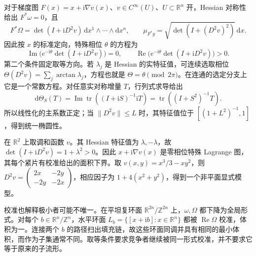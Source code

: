 对于梯度图 \(F(x)=x+\mathrm i\nabla v(x)\)、\(v\in C^\infty(U)\)、\(U\subset\mathbb R^n\) 开，Hessian 对称性给出 \(F^*\omega=0\)，且
\begin{equation}\label{g3:eq:special-lagrangian-graph}
	F^*\Omega=\det(I+\mathrm iD^2v)\,\mathrm dx^1\wedge\cdots\wedge\mathrm dx^n,
	\qquad \mu_{F^*g}=\sqrt{\det(I+(D^2v)^2)}\,\mathrm dx.
\end{equation}
因此按 \(x\) 的标准定向，特殊相位 \(\theta\) 的方程为
\[
	\operatorname{Im}\bigl(e^{-\mathrm i\theta}\det(I+\mathrm iD^2v)\bigr)=0,
	\qquad \operatorname{Re}\bigl(e^{-\mathrm i\theta}\det(I+\mathrm iD^2v)\bigr)>0.
\]
第二个条件固定取等方向。若 \(\lambda_j\) 是 Hessian 的实特征值，可连续选取相位
\(\Theta(D^2v)=\sum_j\arctan\lambda_j\)，方程也就是 \(\Theta=\theta\pmod{2\pi}\)。在连通的选定分支上它是一个常数方程。对任意实对称增量 \(T\)，行列式求导给出
\[
	\mathrm d\Theta_S(T)=\operatorname{Im}\operatorname{tr}((I+\mathrm iS)^{-1}\mathrm iT)
	=\operatorname{tr}((I+S^2)^{-1}T).
\]
所以线性化的主系数正定；当 \(\|D^2v\|\le L\) 时，其特征值位于 \([(1+L^2)^{-1},1]\)，得到统一椭圆性。

\begin{example}\label{g3:exm:harmonic-gradient-calibration}
	在 \(\mathbb R^2\) 上取调和函数 \(v\)。其 Hessian 特征值为 \(\lambda,-\lambda\)，故 \(\det(I+\mathrm iD^2v)=1+\lambda^2>0\)。因此 \(x+\mathrm i\nabla v(x)\) 是零相位特殊 Lagrange 图，其每个紧片有校准给出的面积下界。取
	\(v(x,y)=x^3/3-xy^2\)，则 \(D^2v=\left(\begin{smallmatrix}2x&-2y\\-2y&-2x\end{smallmatrix}\right)\)，相应因子为 \(1+4(x^2+y^2)\)，得到一个非平面显式模型。
\end{example}

校准也解释极小者可能不唯一。在平坦复环面 \(\mathbb R^{2n}/\mathbb Z^{2n}\) 上，\(\omega,\Omega\) 都下降为全局形式。对每个 \(b\in\mathbb R^n/\mathbb Z^n\)，水平环面
\(L_b=\{[x+\mathrm ib]:x\in\mathbb R^n\}\) 都被 \(\operatorname{Re}\Omega\) 校准，体积为一。连接两个 \(b\) 的路径扫出填充链，故这些环面同调并具有相同的最小体积，而作为子集通常不同。取等条件要求竞争者继续被同一形式校准，并不要求它等于原来的子流形。
